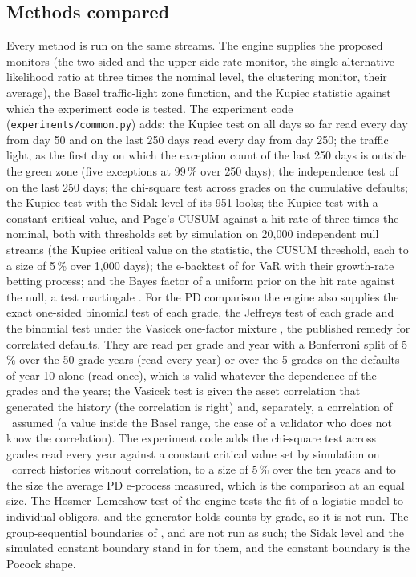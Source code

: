 \subsection{Methods compared}
\label{sec:design-methods}

Every method is run on the same streams. The engine supplies the proposed monitors (the two-sided and the upper-side rate monitor, the single-alternative likelihood ratio at three times the nominal level, the clustering monitor, their average), the Basel traffic-light zone function, and the Kupiec statistic against which the experiment code is tested. The experiment code (\texttt{experiments/common.py}) adds:
the Kupiec test on all days so far read every day from day 50 and on the last 250 days read every day from day 250; the traffic light, as the first day on which the exception count of the last 250 days is outside the green zone (five exceptions at 99\,\% over 250 days); the independence test of \citet{christoffersen1998} on the last 250 days; the chi-square test across grades on the cumulative defaults;
the Kupiec test with the Sidak level of its 951 looks; the Kupiec test with a constant critical value, and Page's CUSUM against a hit rate of three times the nominal, both with thresholds set by simulation on 20,000 independent null streams (the Kupiec critical value on the statistic, the CUSUM threshold, each to a size of 5\,\% over 1,000 days); the e-backtest of \citet{wang2022} for VaR with their growth-rate betting process; and the Bayes factor of a uniform prior on the hit rate against the null, a test martingale \citep{shafer2011}.
For the PD comparison the engine also supplies the exact one-sided binomial test of each grade, the Jeffreys test \citep{jeffreys1946} of each grade and the binomial test under the Vasicek one-factor mixture \citep{gordy2003}, the published remedy for correlated defaults. They are read per grade and year with a Bonferroni split of 5\,\% over the 50 grade-years (read every year) or over the 5 grades on the defaults of year 10 alone (read once), which is valid whatever the dependence of the grades and the years; the Vasicek test is given the asset correlation that generated the history (the correlation is right) and, separately, a correlation of \nPdcAssumedRho\ assumed (a value inside the Basel range, the case of a validator who does not know the correlation). The experiment code adds the chi-square test across grades read every year against a constant critical value set by simulation on \nPdcCalReps\ correct histories without correlation, to a size of 5\,\% over the ten years and to the size the average PD e-process measured, which is the comparison at an equal size. The Hosmer--Lemeshow test of the engine \citep{hosmer1980} tests the fit of a logistic model to individual obligors, and the generator holds counts by grade, so it is not run. The group-sequential boundaries of \citet{pocock1977}, \citet{obrien1979} and \citet{lan1983} are not run as such; the Sidak level and the simulated constant boundary stand in for them, and the constant boundary is the Pocock shape.

